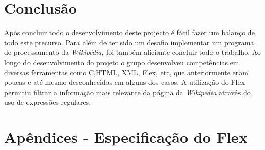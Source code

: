 \documentclass[11pt, a4paper, oneside]{article}
\begin{document}
\newpage
\section{Conclusão}

Após concluir todo o desenvolvimento deste projecto é fácil fazer um balanço de todo este precurso. Para além de ter sido um desafio implementar um programa de processamento da \textit{Wikipédia}, foi também aliciante concluir todo o trabalho.
Ao longo do desenvolvimento do projeto o grupo desenvolveu competências em diversas ferramentas como C,HTML, XML, Flex, etc, que anteriormente eram poucas e até mesmo desconhecidas em alguns dos casos. 
A utilização do Flex permitiu filtrar a informação mais relevante da página da \textit{Wikipédia} através do uso de expressões regulares. 
\newpage
\section{Apêndices - Especificação do Flex}
\end{document}
